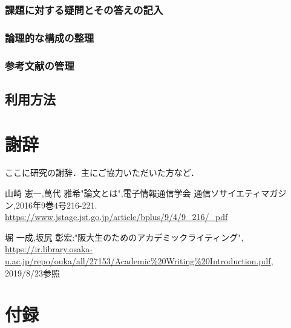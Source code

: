 \documentclass[a4j,12pt]{jarticle}
\begin{document}
\subsubsection{課題に対する疑問とその答えの記入}
\subsubsection{論理的な構成の整理}
\subsubsection{参考文献の管理}

\subsection{利用方法}

\newpage

\section*{謝辞}

ここに研究の謝辞．主にご協力いただいた方など．

\newpage
{}
 \begin{thebibliography}{99}
山崎 憲一,萬代 雅希"論文とは",電子情報通信学会 通信ソサイエティマガジン,2016年9巻4号216-221.
\url{https://www.jstage.jst.go.jp/article/bplus/9/4/9_216/_pdf}

 堀 一成,坂尻 彰宏:"阪大生のためのアカデミックライティング",
\url{https://ir.library.osaka-u.ac.jp/repo/ouka/all/27153/Academic%20Writing%20Introduction.pdf}, 2019/8/23参照
\end{thebibliography}

\section*{付録}

\end{document}
